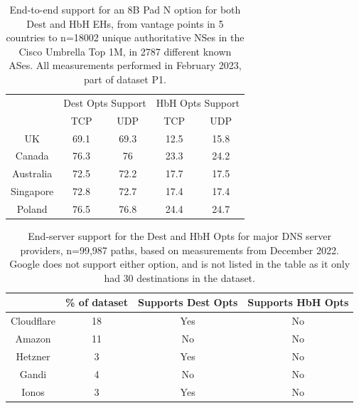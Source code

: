 \documentclass[conference]{IEEEtran}
\begin{document}
\begin{table} 
\begin{tabular}{c|cc|cc}
\multicolumn{1}{l|}{} & \multicolumn{2}{c|}{Dest Opts Support} & \multicolumn{2}{c}{HbH Opts Support} \\ \cline{2-5} 
\multicolumn{1}{l|}{} & \multicolumn{1}{c|}{TCP}       & UDP      & \multicolumn{1}{c|}{TCP}     & UDP     \\ \hline
UK                    & \multicolumn{1}{c|}{69.1}      & 69.3    & \multicolumn{1}{c|}{12.5}    & 15.8  \\ \hline
Canada                & \multicolumn{1}{c|}{76.3}      & 76     & \multicolumn{1}{c|}{23.3}    & 24.2  \\ \hline
Australia             & \multicolumn{1}{c|}{72.5}        & 72.2      & \multicolumn{1}{c|}{17.7}    & 17.5  \\ \hline
Singapore             & \multicolumn{1}{c|}{72.8}      & 72.7    & \multicolumn{1}{c|}{17.4}    & 17.4   \\ \hline
Poland                & \multicolumn{1}{c|}{76.5}      & 76.8   & \multicolumn{1}{c|}{24.4}    & 24.7   
\end{tabular}
\label{tbl:e2e_traversal}
\caption{End-to-end support for an 8B Pad N option for both Dest and HbH EHs, from vantage points in 5 countries to n=18002 unique authoritative NSes in the Cisco Umbrella Top 1M, in 2787 different known ASes. All measurements performed in February 2023, part of dataset P1. }
\end{table}

\begin{table} 
\begin{tabular}{c|c|c|c}
           & \% of dataset & Supports Dest Opts & Supports HbH Opts \\
\hline
Cloudflare & 18                      & Yes                & No                 \\
\hline
Amazon     & 11                     & No                 & No                 \\
\hline
Hetzner    & 3                     & Yes                & No                 \\
\hline
Gandi      & 4                     & No                 & No                 \\
\hline
Ionos      & 3                    & Yes                & No                
\end{tabular}
\label{tbl:provider_support}
\caption{End-server support for the Dest and HbH Opts for major DNS server providers, n=99,987 paths, based on measurements from December 2022. Google does not support either option, and is not listed in the table as it only had 30 destinations in the dataset.
}
\end{table}
\end{document}
